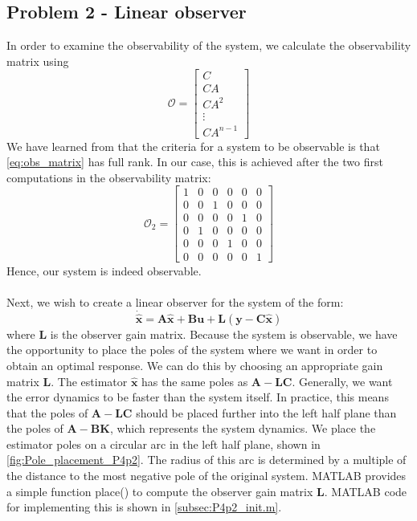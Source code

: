 \subsection{Problem 2 - Linear observer}\label{subsec:P4p2}
In order to examine the observability of the system, we calculate the observability matrix using
\begin{equation}\label{eq:obs_matrix}
    {\mathcal {O}}={\begin{bmatrix}C\\CA\\CA^{2}\\\vdots \\CA^{n-1}\end{bmatrix}}
\end{equation}
We have learned from\cite{Lecture_5} that the criteria for a system to be observable is that \eqref{eq:obs_matrix} has full rank. In our case, this is achieved after the two first computations in the observability matrix:
\begin{equation}\label{eq:obs_matrix_calc}
    {\mathcal {O}}_{2}=
    {\begin{bmatrix}
        1 & 0 & 0 & 0 & 0 & 0\\
        0 & 0 & 1 & 0 & 0 & 0\\
        0 & 0 & 0 & 0 & 1 & 0\\
        0 & 1 & 0 & 0 & 0 & 0\\
        0 & 0 & 0 & 1 & 0 & 0\\
        0 & 0 & 0 & 0 & 0 & 1
    \end{bmatrix}}
\end{equation}
Hence, our system is indeed observable.\\
\\
Next, we wish to create a linear observer for the system of the form:
\begin{equation}\label{observer_system}
    \mathbf{\dot{\hat{x}} = A\hat{x} + Bu + L(y - C\hat{x})}
\end{equation}
where \textbf{L} is the observer gain matrix.
Because the system is observable, we have the opportunity to place the poles of the system where we want in order to obtain an optimal response. We can do this by choosing an appropriate gain matrix \textbf{L}. The estimator $\mathbf{\hat{x}}$ has the same poles as $\mathbf{A - LC}$. Generally, we want the error dynamics to be faster than the system itself. In practice, this means that the poles of $\mathbf{A - LC}$ should be placed further into the left half plane than the poles of $\mathbf{A - BK}$, which represents the system dynamics. We place the estimator poles on a circular arc in the left half plane, shown in \cref{fig:Pole_placement_P4p2}. The radius of this arc is determined by a multiple of the distance to the most negative pole of the original system. MATLAB provides a simple function place() to compute the observer gain matrix \textbf{L}. MATLAB code for implementing this is shown in \cref{subsec:P4p2_init.m}.
